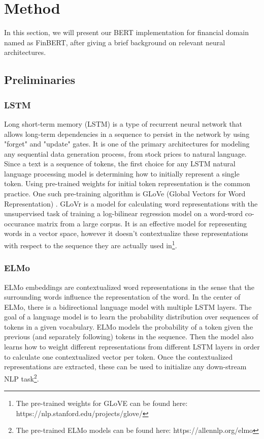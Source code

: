 \documentclass[../main.tex]{subfiles}
\begin{document}
\section{Method} \label{sec:method}

In this section, we will present our BERT implementation for financial domain named as FinBERT, after giving a brief background on relevant neural architectures.

\subsection{Preliminaries} \label{neural baselines}

\subsubsection{LSTM}
Long short-term memory (LSTM) is a type of recurrent neural network that allows long-term dependencies in a sequence to persist in the network by using "forget" and "update" gates. It is one of the primary architectures for modeling any sequential data generation process, from stock prices to natural language. 
Since a text is a sequence of tokens, the first choice for any LSTM natural language processing model is determining how to initially represent a single token. Using pre-trained weights for initial token representation is the common practice. One such pre-training algorithm is GLoVe (Global Vectors for Word Representation) \cite{pennington-etal-2014-glove}. GLoVr is a model for calculating word representations with the unsupervised task of training a log-bilinear regression model on a word-word co-occurance matrix from a large corpus. It is an effective model for representing words in a vector space, however it doesn't contextualize these representations with respect to the sequence they are actually used in\footnote{The pre-trained weights for GLoVE can be found here: https://nlp.stanford.edu/projects/glove/}.

\subsubsection{ELMo} \label{basic lstm models}
 ELMo embeddings \cite{Peters2018} are contextualized word representations in the sense that the surrounding words influence the representation of the word. In the center of ELMo, there is a bidirectional language model with multiple LSTM layers. The goal of a language model is to learn the probability distribution over sequences of tokens in a given vocabulary. ELMo models the probability of a token given the previous (and separately following) tokens in the sequence. Then the model also learns how to weight different representations from different LSTM layers in order to calculate one contextualized vector per token. Once the contextualized representations are extracted, these can be used to initialize any down-stream NLP task\footnote{The pre-trained ELMo models can be found here: https://allennlp.org/elmo}.
 
\end{document}
